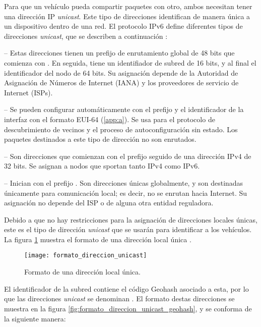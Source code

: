 \label{subsec:formato_direcciones_ipv6_unicast}

Para que un vehículo pueda compartir paquetes con otro, ambos necesitan tener
una dirección IP \textit{unicast}. Este tipo de direcciones identifican de
manera única a un dispositivo dentro de una red. El protocolo IPv6 define
diferentes tipos de direcciones \textit{unicast}, que se describen a
continuación \cite{CiscoIpv62011}:

 -- Estas direcciones tienen un prefijo de
enrutamiento global de 48 bits que comienza con . En seguida,
tiene un identifiador de subred de  16 bits, y al final el identificador del
nodo de 64 bits. Su asignación depende de la Autoridad de Asignación de Números
de Internet (IANA) y los proveedores de servicio de Internet (ISPs).

 --  Se pueden configurar automáticamente con
el prefijo  y el identificador de la interfaz con el formato
EUI-64 (\ref{app:a}). Se usa para el protocolo de descubrimiento de vecinos y
el proceso de autoconfiguración sin estado. Los paquetes destinados a este tipo de
dirección no son enrutados.

 -- Son direcciones que comienzan con el
prefijo  seguido de una dirección IPv4 de 32 bits. Se asignan a
nodos que sportan tanto IPv4 como IPv6.

 -- Inician con el prefijo . Son
direcciones únicas globalmente, y son destinadas únicamente para comunicación
local; es decir, no se enrutan hacia Internet. Su asignación no depende del ISP
o de alguna otra entidad reguladora.

Debido a que no hay restricciones para la asignación de direcciones locales
únicas, este es el tipo de dirección \textit{unicast} que se usarán para
identificar a los vehículos. La figura \ref{fig:formato_direccion_unicast}
muestra el formato de una dirección local única \cite{CiscoIpv62011}.

\begin{figure}[th!]
\centering
\texttt{[image: formato\_direccion\_unicast]}
\decoRule
\caption[Formato de una dirección local única]{Formato de una dirección
local única.}
\label{fig:formato_direccion_unicast}
\end{figure}

El identificador de la subred contiene el código Geohash asociado a esta, por
lo que las direcciones \textit{unicast} se denominan . El formato destas direcciones se muestra en la
figura \ref{fig:formato_direccion_unicast_geohash}, y se conforma de la
siguiente manera:


